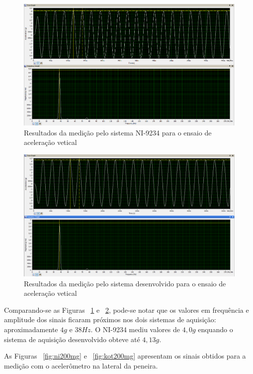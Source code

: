 \documentclass[
	12pt,				%
	openright,			%
	twoside,			%
	a4paper,			%
	english,			%
	french,				%
	spanish,			%
	brazil,				%
	]{abntex2}
\begin{document}
		\begin{figure}[!ht]
			\centering
			\includegraphics[width=\linewidth]{../Fotos/ni4g.png}
			\caption{Resultados da medição pelo sistema NI-9234 para o ensaio de aceleração vetical}
			\label{fig:ni4g}
		\end{figure}

		\begin{figure}[!ht]
			\centering
			\includegraphics[width=\linewidth]{../Fotos/kot4g.png}
			\caption{Resultados da medição pelo sistema desenvolvido para o ensaio de aceleração vetical}
			\label{fig:kot4g}
		\end{figure}

		Comparando-se as Figuras ~\ref{fig:ni4g} e ~\ref{fig:kot4g}, pode-se notar que os valores em frequência e amplitude dos sinais ficaram próximos nos dois sistemas de aquisição: aproximadamente $4g$ e $38Hz$. O NI-9234 mediu valores de $4,0g$ enquando o sistema de aquisição desenvolvido obteve até $4,13g$.

		As Figuras ~\ref{fig:ni200mg} e ~\ref{fig:kot200mg} apresentam os sinais obtidos para a medição com o acelerômetro na lateral da peneira.
\end{document}
